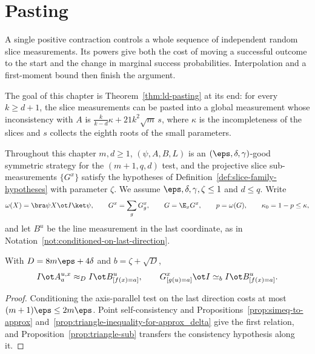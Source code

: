 \chapter{Pasting}
\label{chap:pasting}
\label{sec:ld-pasting}

A single positive contraction controls a whole sequence of independent
random slice measurements.  Its powers give both the cost of moving a
successful outcome to the start and the change in marginal success
probabilities.  Interpolation and a first-moment bound then finish the
argument.

The goal of this chapter is Theorem~\ref{thm:ld-pasting} at its end: for
every $k\ge d+1$, the slice measurements can be pasted into a global
measurement whose inconsistency with $A$ is
$\frac k{k-d}\kappa+21k^2\sqrt m\,s$, where $\kappa$ is the incompleteness
of the slices and $s$ collects the eighth roots of the small parameters.

Throughout this chapter $m,d\ge1$, $(\psi,A,B,L)$ is an
$(\eps,\delta,\gamma)$-good symmetric strategy for the $(m+1,q,d)$ test,
and the projective slice sub-measurements $\{G^x\}$ satisfy the hypotheses
of Definition~\ref{def:slice-family-hypotheses} with parameter $\zeta$.  We
assume $\eps,\delta,\gamma,\zeta\le1$ and $d\le q$.  Write
\[
	\omega(X)=\bra\psi X\ot I\ket\psi,\qquad
	G^x=\sum_gG^x_g,\qquad G=\E_xG^x,\qquad
	p=\omega(G),\qquad\kappa_0=1-p\le\kappa,
\]
and let $B^u$ be the line measurement in the last coordinate, as in
Notation~\ref{not:conditioned-on-last-direction}.

\begin{lemma}\label{lem:ld-gbcon}
	\leanok
	With $D=8m\eps+4\delta$ and $b=\zeta+\sqrt D$,
	\[
		I\ot A^{u,x}_a\approx_DI\ot B^u_{[f(x)=a]},\qquad
		G^x_{[g(u)=a]}\ot I\simeq_bI\ot B^u_{[f(x)=a]}.
	\]
\end{lemma}
\begin{proof}
	\leanok
	Conditioning the axis-parallel test on the last direction costs at most
	$(m+1)\eps\le2m\eps$.  Point self-consistency and
	Propositions~\ref{prop:simeq-to-approx}
	and~\ref{prop:triangle-inequality-for-approx_delta} give the first
	relation, and Proposition~\ref{prop:triangle-sub} transfers the
	consistency hypothesis along it.
\end{proof}

